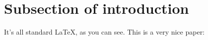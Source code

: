 \documentclass[a4paper,12pt]{report}
\begin{document}
		\section{Subsection of introduction}
		\startsection
			It's all standard \LaTeX, as you can see. This is a very nice paper: \cite{NokiaWisdomOfTheCrowds} \cite{NokiaAVACrowdAnalytics} \cite{SmartIdeasForSmartCities} \cite{CrowdPoweredSmartCities} \cite{MakingCitiesSmarter} \cite{WisdomOfStakeholders} \cite{CrowdSourcing} \cite{MobileCrowdSourcing} \cite{SmartCityJeddah} \cite{NextWaveOfInnovation} \cite{zadeh} \cite{LanierWeylBlueprint} \cite{LanierWeylNYTOpinion}
		\closesection


	\newpage
	
		
\end{document}
